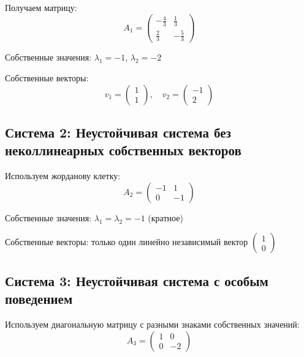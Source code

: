 Получаем матрицу:
\begin{equation}
A_1 = \begin{pmatrix} -\frac{4}{3} & \frac{1}{3} \\ \frac{2}{3} & -\frac{5}{3} \end{pmatrix}
\end{equation}

Собственные значения: $\lambda_1 = -1$, $\lambda_2 = -2$

Собственные векторы:
\begin{equation}
v_1 = \begin{pmatrix} 1 \\ 1 \end{pmatrix}, \quad v_2 = \begin{pmatrix} -1 \\ 2 \end{pmatrix}
\end{equation}

\subsection{Система 2: Неустойчивая система без неколлинеарных собственных векторов}

Используем жорданову клетку:
\begin{equation}
A_2 = \begin{pmatrix} -1 & 1 \\ 0 & -1 \end{pmatrix}
\end{equation}

Собственные значения: $\lambda_1 = \lambda_2 = -1$ (кратное)

Собственные векторы: только один линейно независимый вектор $\begin{pmatrix} 1 \\ 0 \end{pmatrix}$

\subsection{Система 3: Неустойчивая система с особым поведением}

Используем диагональную матрицу с разными знаками собственных значений:
\begin{equation}
A_3 = \begin{pmatrix} 1 & 0 \\ 0 & -2 \end{pmatrix}
\end{equation}

